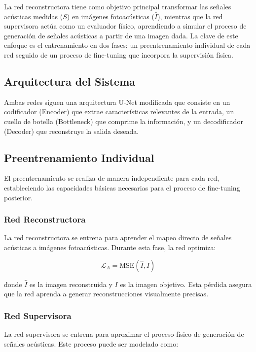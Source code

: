 La red reconstructora tiene como objetivo principal transformar las señales acústicas medidas ($S$) en imágenes fotoacústicas ($\hat{I}$), mientras que la red supervisora actúa como un evaluador físico, aprendiendo a simular el proceso de generación de señales acústicas a partir de una imagen dada. La clave de este enfoque es el entrenamiento en dos fases: un preentrenamiento individual de cada red seguido de un proceso de fine-tuning que incorpora la supervisión física.

\subsection{Arquitectura del Sistema}

Ambas redes siguen una arquitectura U-Net modificada que consiste en un codificador (Encoder) que extrae características relevantes de la entrada, un cuello de botella (Bottleneck) que comprime la información, y un decodificador (Decoder) que reconstruye la salida deseada.

\subsection{Preentrenamiento Individual}

El preentrenamiento se realiza de manera independiente para cada red, estableciendo las capacidades básicas necesarias para el proceso de fine-tuning posterior.

\subsubsection{Red Reconstructora}
La red reconstructora se entrena para aprender el mapeo directo de señales acústicas a imágenes fotoacústicas. Durante esta fase, la red optimiza:

\begin{equation}
    \mathcal{L}_A = \text{MSE}(\hat{I}, I)
\end{equation}

donde $\hat{I}$ es la imagen reconstruida y $I$ es la imagen objetivo. Esta pérdida asegura que la red aprenda a generar reconstrucciones visualmente precisas.

\subsubsection{Red Supervisora}
La red supervisora se entrena para aproximar el proceso físico de generación de señales acústicas. Este proceso puede ser modelado como:

